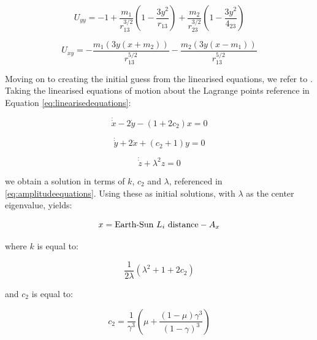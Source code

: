 \begin{equation}
	U_{yy} = -1 + \frac{m_1}{r_{13}^{3/2}} \left(1-\frac{3y^2}{r_{13}}\right) + \frac{m_2}{r_{23}^{3/2}} \left(1-\frac{3y^2}{4_{23}} \right)
\end{equation}

\begin{equation}
	U_{xy} = -\frac{m_1(3y(x+m_2))}{r_{13}^{5/2}} - \frac{m_2(3y(x-m_1))}{r_{13}^{5/2}}
\end{equation}

Moving on to creating the initial guess from the linearised equations, we refer to \citep{Richardson1980}. Taking the linearised equations of motion about the Lagrange points reference in Equation \ref{eq:linearisedequations}:

\begin{equation}
	\dot{\dot{x}} - 2\dot{y} - (1+2c_2)x = 0
\end{equation}

\begin{equation}
	\dot{\dot{y}} + 2\dot{x} + (c_2+1)y = 0
\end{equation}

\begin{equation}
	\dot{\dot{z}} + \lambda ^2 z = 0
\end{equation}

we obtain a solution in terms of $k$, $c_2$ and $\lambda$, referenced in \ref{eq:amplitudeequations}. Using these as initial solutions, with $\lambda$ as the center eigenvalue, yields:

\begin{equation}
	x = \textnormal{Earth-Sun}~L_i~\textnormal{distance} - A_x
\end{equation}

\noindent where $k$ is equal to:

\begin{equation}
	\frac{1}{2\lambda} \left( \lambda^2 + 1 + 2c_2 \right)
\end{equation}

\noindent and $c_2$ is equal to:

\begin{equation}
	c_2 = \frac{1}{\gamma^3} \left( \mu + \frac{\left( 1 - \mu \right)\gamma ^3}{\left( 1 - \gamma \right)^3} \right)
\end{equation}



